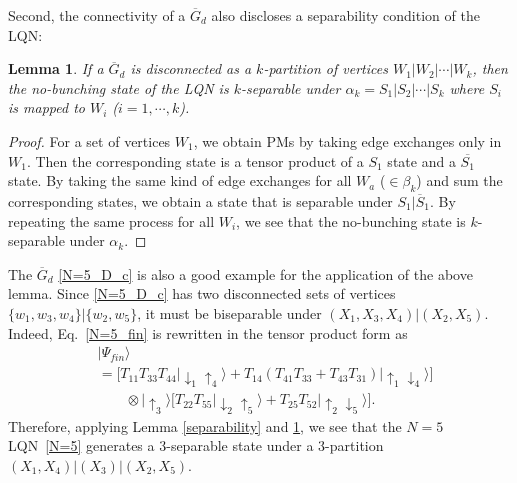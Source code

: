 \documentclass[a4paper,twocolumn,8pt,accepted=2021-12-15]{quantumarticle}
\newtheorem{lemma}{Lemma}
\newcommand{\nn}{\nonumber}
\def\a{\alpha}
\def\b{\beta}
\def\P{\Psi}
\def\>{\rangle}
\def\dc{{\overline{G}_d }}
\begin{document}
	Second, the connectivity of a $\dc$ also discloses a separability condition of the LQN:
	\begin{lemma}\label{disconnection}
		If a $\dc$ is disconnected as a $k$-partition of vertices $W_1|W_2|\cdots| W_k$, then the no-bunching state of the LQN is $k$-separable under $\a_k =S_1|S_2|\cdots| S_k$ where $S_i$ is mapped to $W_i$ ($i=1,\cdots,k$).  
	\end{lemma}
	\begin{proof}
		For a set of vertices $W_1$, we obtain PMs by taking edge exchanges only in $W_1$. Then the corresponding state is a tensor product of a $S_1$ state and a $\overline{S_1}$ state. By taking the same kind of edge exchanges for all $W_a$ ($\in \b_k$) and sum the corresponding states, we obtain a state  that is separable under $S_1|\overline{S}_1$. By repeating the same process for all $W_i$, we see that the no-bunching state is $k$-separable under $\a_k$.
	\end{proof}
	The $\dc$ \eqref{N=5_D_c} is also a good example for the application of the above lemma. Since \eqref{N=5_D_c} has two disconnected sets of vertices $\{w_1,w_3,w_4\}|\{w_2,w_5\}$, it must be biseparable under $(X_1,X_3,X_4)|(X_2,X_5)$. Indeed, Eq.~\eqref{N=5_fin} is rewritten in the tensor product form  as
	\begin{align}\label{N=5_arr}
		&|\P_{fin}\> \nn \\ 
		&= \Big[T_{11}T_{33}T_{44}|\downarrow_1 \uparrow_4\>+ T_{14}(T_{41}T_{33}+ T_{43}T_{31})|\uparrow_1 \downarrow_4\>\Big] \nn \\
		&\qquad \otimes |\uparrow_3\>\Big[T_{22}T_{55}|\downarrow_2\uparrow_5\> + T_{25}T_{52}|\uparrow_2 \downarrow_5\>\Big].
	\end{align}
	Therefore, applying Lemma \ref{separability} and \ref{disconnection}, we see that the $N=5$ LQN~\eqref{N=5} generates a $3$-separable state under a 3-partition $(X_1,X_4)|(X_3)|(X_2,X_5)$.
	
\end{document}

